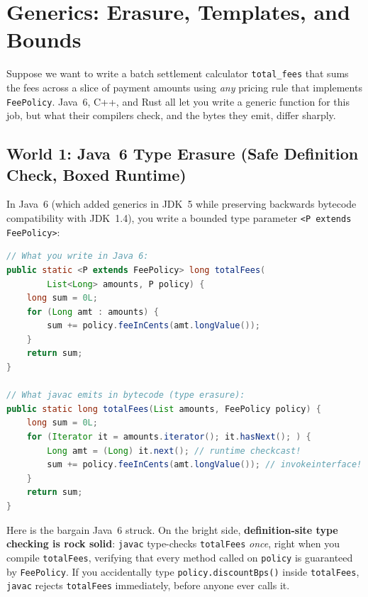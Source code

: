\section{Generics: Erasure, Templates, and Bounds}
\label{ch06:generics-three-models}

Suppose we want to write a batch settlement calculator \texttt{total\_fees} that sums the fees across a slice of payment amounts using \emph{any} pricing rule that implements \texttt{FeePolicy}. Java~6, C++, and Rust all let you write a generic function for this job, but what their compilers check, and the bytes they emit, differ sharply. 

\subsection{World 1: Java~6 Type Erasure (Safe Definition Check, Boxed Runtime)}

In Java~6 (which added generics in JDK~5 while preserving backwards bytecode compatibility with JDK~1.4), you write a bounded type parameter \texttt{<P extends FeePolicy>}:

\begin{lstlisting}[language=Java, caption={Java 6 bounded generic method and what the compiler erases it into.}]
// What you write in Java 6:
public static <P extends FeePolicy> long totalFees(
        List<Long> amounts, P policy) {
    long sum = 0L;
    for (Long amt : amounts) {
        sum += policy.feeInCents(amt.longValue());
    }
    return sum;
}

// What javac emits in bytecode (type erasure):
public static long totalFees(List amounts, FeePolicy policy) {
    long sum = 0L;
    for (Iterator it = amounts.iterator(); it.hasNext(); ) {
        Long amt = (Long) it.next(); // runtime checkcast!
        sum += policy.feeInCents(amt.longValue()); // invokeinterface!
    }
    return sum;
}
\end{lstlisting}

Here is the bargain Java~6 struck. On the bright side, \textbf{definition-site type checking is rock solid}: \texttt{javac} type-checks \texttt{totalFees} \emph{once}, right when you compile \texttt{totalFees}, verifying that every method called on \texttt{policy} is guaranteed by \texttt{FeePolicy}. If you accidentally type \texttt{policy.discountBps()} inside \texttt{totalFees}, \texttt{javac} rejects \texttt{totalFees} immediately, before anyone ever calls it.

